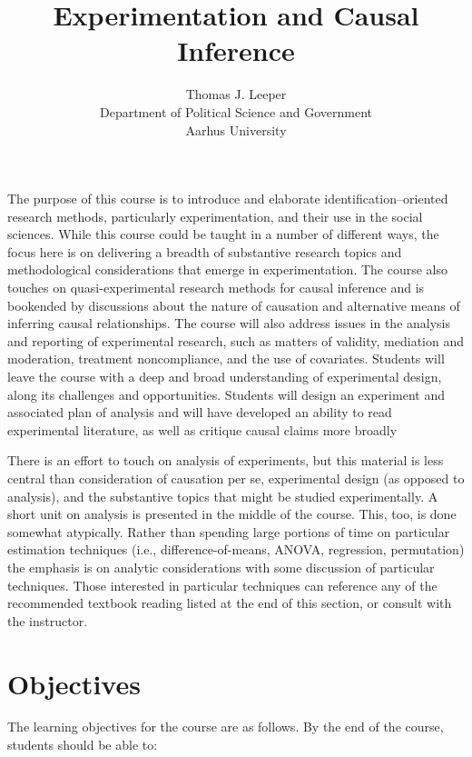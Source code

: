 \documentclass[12pt,a4paper]{article}
\title{Experimentation and Causal Inference}
\author{Thomas J. Leeper\\
Department of Political Science and Government\\
Aarhus University}
\begin{document}
\nobibliography*

\maketitle

\faketableofcontents


The purpose of this course is to introduce and elaborate identification--oriented research methods, particularly experimentation, and their use in the social sciences. While this course could be taught in a number of different ways, the focus here is on delivering a breadth of substantive research topics and methodological considerations that emerge in experimentation. The course also touches on quasi-experimental research methods for causal inference and is bookended by discussions about the nature of causation and alternative means of inferring causal relationships. The course will also address issues in the analysis and reporting of experimental research, such as matters of validity, mediation and moderation, treatment noncompliance, and the use of covariates. Students will leave the course with a deep and broad understanding of experimental design, along its challenges and opportunities. Students will design an experiment and associated plan of analysis and will have developed an ability to read experimental literature, as well as critique causal claims more broadly

There is an effort to touch on analysis of experiments, but this material is less central than consideration of causation per se, experimental design (as opposed to analysis), and the substantive topics that might be studied experimentally. A short unit on analysis is presented in the middle of the course. This, too, is done somewhat atypically. Rather than spending large portions of time on particular estimation techniques (i.e., difference-of-means, ANOVA, regression, permutation) the emphasis is on analytic considerations with some discussion of particular techniques. Those interested in particular techniques can reference any of the recommended textbook reading listed at the end of this section, or consult with the instructor.

\section{Objectives}
The learning objectives for the course are as follows. By the end of the course, students should be able to:
\end{document}
